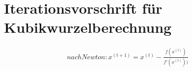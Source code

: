 \documentclass[12pt,a4paper]{article}
\begin{document}
	\section{Iterationsvorschrift für Kubikwurzelberechnung}
	\begin{align}
		nach Newton: 
		x^{(t+1)} = x^{(t)} - \frac{f(x^{(t)})}{f'(x^{(t)}))}
	\end{align}
\end{document}
